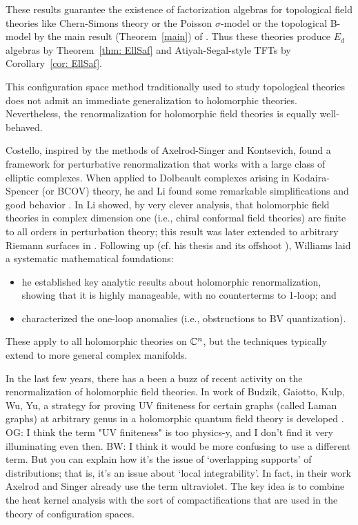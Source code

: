 \documentclass[11pt]{amsart}
\def\brian#1{{\textcolor{blue!75!red}{BW: {#1}}}}
\def\owen#1{{\textcolor{violet!50!black}{OG: {#1}}}}
\begin{document}
These results guarantee the existence of factorization algebras for topological field theories like Chern-Simons theory or the Poisson $\sigma$-model or the topological B-model by the main result (Theorem~\ref{main}) of \cite{CG2}.
Thus these theories produce $E_d$ algebras by Theorem~\ref{thm: EllSaf} and Atiyah-Segal-style TFTs by Corollary~\ref{cor: EllSaf}.

This configuration space method traditionally used to study topological theories does not admit an immediate generalization to holomorphic theories.
Nevertheless, the renormalization for holomorphic field theories is equally well-behaved.

Costello, inspired by the methods of Axelrod-Singer and Kontsevich,
found a framework for perturbative renormalization that works with a large class of elliptic complexes.
When applied to Dolbeault complexes arising in Kodaira-Spencer (or BCOV) theory, 
he and Li found some remarkable simplifications and good behavior \cite{??}.
In \cite{LiVertex} Li showed, by very clever analysis, that holomorphic field theories in complex dimension one (i.e., chiral conformal field theories) are finite to all orders in perturbation theory; 
this result was later extended to arbitrary Riemann surfaces in \cite{Jie and Si}.
Following up (cf. his thesis \cite{BWthesis} and its offshoot \cite{BWhol}), Williams laid a systematic mathematical foundations:
\begin{itemize}
\item he established key analytic results about holomorphic renormalization, 
showing that it is highly manageable, with no counterterms to 1-loop; and
\item characterized the one-loop anomalies  (i.e., obstructions to BV quantization).
\end{itemize}
These apply to all holomorphic theories on $\mathbb C^n$,
but the techniques typically extend to more general complex manifolds.

In the last few years,
there has a been a buzz of recent activity on the renormalization of holomorphic field theories.
In work of Budzik, Gaiotto, Kulp, Wu, Yu, a strategy for proving UV finiteness for certain graphs (called Laman graphs) at arbitrary genus in a holomorphic quantum field theory is developed \cite{BGKWY}.
\owen{I think the term "UV finiteness" is too physics-y, and I don't find it very illuminating even then.}
\brian{I think it would be more confusing to use a different term. But you can explain how it's the issue of `overlapping supports' of distributions; that is, it's an issue about `local integrability'. In fact, in their work Axelrod and Singer already use the term ultraviolet.}
The key idea is to combine the heat kernel analysis with the sort of compactifications that are used in the theory of configuration spaces.
\end{document}
